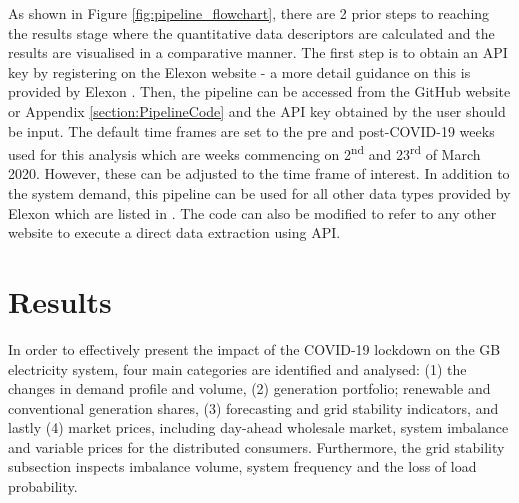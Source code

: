\documentclass[energies,article,submit,moreauthors,pdftex]{Definitions/mdpi}
\begin{document}
As shown in Figure \ref{fig:pipeline_flowchart}, there are 2 prior steps to reaching the results stage where the quantitative data descriptors are calculated and the results are visualised in a comparative manner. The first step is to obtain an API key by registering on the Elexon website \cite{ElectricityBMRS} - a more detail guidance on this is provided by Elexon \cite{Elexon2019BMRSArchitecture}. Then, the pipeline can be accessed from the GitHub website \cite{KirliElectricityPipeline} or Appendix \ref{section:PipelineCode} and the API key obtained by the user should be input. The default time frames are set to the pre and post-COVID-19 weeks used for this analysis which are weeks commencing on 2\textsuperscript{nd} and 23\textsuperscript{rd} of March 2020. However, these can be adjusted to the time frame of interest. In addition to the system demand, this pipeline can be used for all other data types provided by Elexon which are listed in \cite{Elexon2019BMRSArchitecture}. The code can also be modified to refer to any other website to execute a direct data extraction using API.








\section{Results \label{section:Results}}
In order to effectively present the impact of the COVID-19 lockdown on the GB electricity system, four main categories are identified and analysed: (1) the changes in demand profile and volume, (2) generation portfolio; renewable and conventional generation shares, (3) forecasting and grid stability indicators, and lastly (4) market prices, including day-ahead wholesale market, system imbalance and variable prices for the distributed consumers. Furthermore, the grid stability subsection inspects imbalance volume, system frequency and the loss of load probability. 
\end{document}
